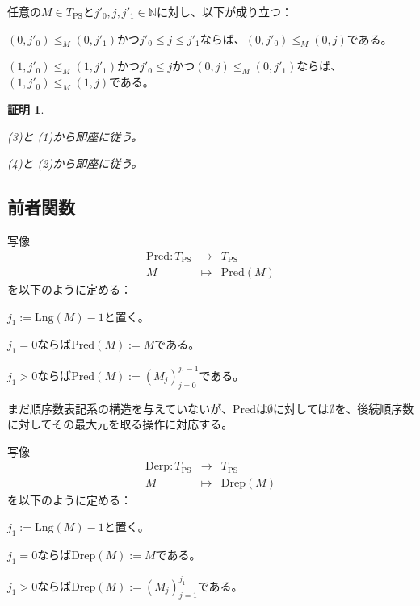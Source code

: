 \documentclass[dvipdfmx,uplatex]{jsarticle}
\theoremstyle{customnonumberbreakfortheorem}
\theoremstyle{customnonumberbreakforproof}
\newtheorem{hideableproof}{証明}
\begin{document}
\begin{corollary}[直系先祖の木構造]\label{直系先祖の木構造}
	任意の\(M \in T_{\textrm{PS}}\)と\(j'_0, j, j'_1 \in \mathbb{N}\)に対し、以下が成り立つ：
	\begin{penumerate}
		\item \((0,j'_0) \leq_M (0,j'_1)\)かつ\(j'_0 \leq j \leq j'_1\)ならば、\((0,j'_0) \leq_M (0,j)\)である。
		\item \((1,j'_0) \leq_M (1,j'_1)\)かつ\(j'_0 \leq j\)かつ\((0,j) \leq_M (0,j'_1)\)ならば、\((1,j'_0) \leq_M (1,j)\)である。
	\end{penumerate}
\end{corollary}

\begin{hideableproof}
	\begin{penumerate}
		\item {} (3)と (1)から即座に従う。
		\item {} (4)と (2)から即座に従う。
	\end{penumerate}
\end{hideableproof}


\subsection{前者関数}

写像
\begin{eqnarray*}
\textrm{Pred} \colon T_{\textrm{PS}} & \to & T_{\textrm{PS}} \\
M & \mapsto & \textrm{Pred}(M)
\end{eqnarray*}
を以下のように定める：
\begin{nenumerate}
	\item \(j_1 := \textrm{Lng}(M)-1\)と置く。
	\item \(j_1 = 0\)ならば\(\textrm{Pred}(M) := M\)である。
	\item \(j_1 > 0\)ならば\(\textrm{Pred}(M) := (M_j)_{j=0}^{j_1-1}\)である。
\end{nenumerate}

まだ順序数表記系の構造を与えていないが、\(\textrm{Pred}\)は\(\emptyset\)に対しては\(\emptyset\)を、後続順序数に対してその最大元を取る操作に対応する。

写像
\begin{eqnarray*}
\textrm{Derp} \colon T_{\textrm{PS}} & \to & T_{\textrm{PS}} \\
M & \mapsto & \textrm{Drep}(M)
\end{eqnarray*}
を以下のように定める：
\begin{nenumerate}
	\item \(j_1 := \textrm{Lng}(M)-1\)と置く。
	\item \(j_1 = 0\)ならば\(\textrm{Drep}(M) := M\)である。
	\item \(j_1 > 0\)ならば\(\textrm{Drep}(M) := (M_j)_{j=1}^{j_1}\)である。
\end{nenumerate}
\end{document}

